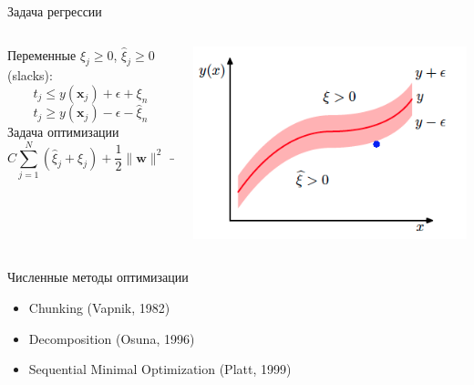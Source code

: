 \documentclass[10pt]{beamer}
\begin{document}
\begin{frame}{Задача регрессии}

\begin{columns}[T]
    \begin{column}{.51\textwidth}
    
    Переменные $\xi_j \geq 0$, $\hat \xi_j \geq 0$ (slacks):
    \[
    t_j \leq y(\mathbf{x}_j) + \epsilon + \xi_n
    \]
     \[
    t_j \geq y(\mathbf{x}_j) - \epsilon - \hat \xi_n
    \]
    Задача оптимизации
    \[
    C \sum_{j=1}^N (\hat \xi_j + \xi_j) + \frac{1}{2}\|\mathbf{w}\|^2 \rightarrow \min_{\mathbf{w}, b}
    \]    
	
    \end{column}
       
    \begin{column}{.5\textwidth}
    	\vspace{0em}
		\begin{center}
   			\includegraphics[scale=0.45]{images/regression.png}
    	\end{center}
	\end{column}
\end{columns}

\end{frame}

\begin{frame}{Численные методы оптимизации}

\begin{itemize}
\item Chunking (Vapnik, 1982)
\item Decomposition (Osuna, 1996)
\item Sequential Minimal Optimization (Platt, 1999)
\end{itemize}

\end{frame}

\end{document}
